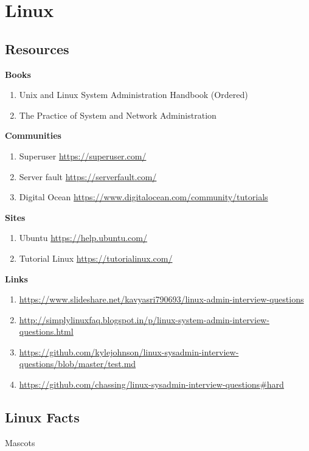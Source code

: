 \documentclass{notes}
\begin{document}
\tableofcontents
\chapter{Linux}
\section{Resources}
	\textbf{Books}
		\begin{enumerate}
			\item Unix and Linux System Administration Handbook (Ordered)
			\item The Practice of System and Network Administration
		\end{enumerate}
	\textbf{Communities}
		\begin{enumerate}
			\item Superuser \ra \url{https://superuser.com/}
			\item Server fault \ra \url{https://serverfault.com/}
			\item Digital Ocean \ra \url{https://www.digitalocean.com/community/tutorials}
		\end{enumerate}
	\textbf{Sites}
		\begin{enumerate}
			\item Ubuntu \ra \url{https://help.ubuntu.com/}
			\item Tutorial Linux \ra \url{https://tutorialinux.com/}
		\end{enumerate}
	\textbf{Links}
		\begin{enumerate}
			\item \url{https://www.slideshare.net/kavyasri790693/linux-admin-interview-questions}
			\item \url{http://simplylinuxfaq.blogspot.in/p/linux-system-admin-interview-questions.html}
			\item \url{https://github.com/kylejohnson/linux-sysadmin-interview-questions/blob/master/test.md}
			\item \url{https://github.com/chassing/linux-sysadmin-interview-questions#hard}
		\end{enumerate}

\newpage

\section{Linux Facts}
	\begin{questions}{Mascots}
		\begin{questionAnswer}
		\end{questionAnswer}
	\end{questions}
\end{document}
